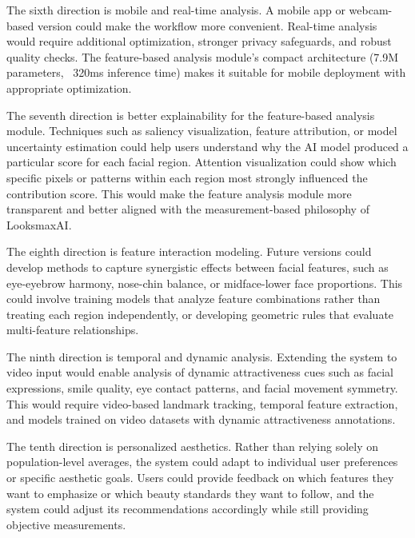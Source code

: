 The sixth direction is mobile and real-time analysis. A mobile app or webcam-based version could make the workflow more convenient. Real-time analysis would require additional optimization, stronger privacy safeguards, and robust quality checks. The feature-based analysis module's compact architecture (7.9M parameters, ~320ms inference time) makes it suitable for mobile deployment with appropriate optimization.

The seventh direction is better explainability for the feature-based analysis module. Techniques such as saliency visualization, feature attribution, or model uncertainty estimation could help users understand why the AI model produced a particular score for each facial region. Attention visualization could show which specific pixels or patterns within each region most strongly influenced the contribution score. This would make the feature analysis module more transparent and better aligned with the measurement-based philosophy of LooksmaxAI.

The eighth direction is feature interaction modeling. Future versions could develop methods to capture synergistic effects between facial features, such as eye-eyebrow harmony, nose-chin balance, or midface-lower face proportions. This could involve training models that analyze feature combinations rather than treating each region independently, or developing geometric rules that evaluate multi-feature relationships.

The ninth direction is temporal and dynamic analysis. Extending the system to video input would enable analysis of dynamic attractiveness cues such as facial expressions, smile quality, eye contact patterns, and facial movement symmetry. This would require video-based landmark tracking, temporal feature extraction, and models trained on video datasets with dynamic attractiveness annotations.

The tenth direction is personalized aesthetics. Rather than relying solely on population-level averages, the system could adapt to individual user preferences or specific aesthetic goals. Users could provide feedback on which features they want to emphasize or which beauty standards they want to follow, and the system could adjust its recommendations accordingly while still providing objective measurements.
